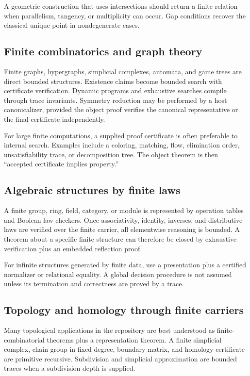 A geometric construction that uses intersections should return a finite relation when parallelism, tangency, or multiplicity can occur.  Gap conditions recover the classical unique point in nondegenerate cases.

\subsection{Finite combinatorics and graph theory}

Finite graphs, hypergraphs, simplicial complexes, automata, and game trees are direct bounded structures.  Existence claims become bounded search with certificate verification.  Dynamic programs and exhaustive searches compile through trace invariants.  Symmetry reduction may be performed by a host canonicalizer, provided the object proof verifies the canonical representative or the final certificate independently.

For large finite computations, a supplied proof certificate is often preferable to internal search.  Examples include a coloring, matching, flow, elimination order, unsatisfiability trace, or decomposition tree.  The object theorem is then ``accepted certificate implies property.''

\subsection{Algebraic structures by finite laws}

A finite group, ring, field, category, or module is represented by operation tables and Boolean law checkers.  Once associativity, identity, inverses, and distributive laws are verified over the finite carrier, all elementwise reasoning is bounded.  A theorem about a specific finite structure can therefore be closed by exhaustive verification plus an embedded reflection proof.

For infinite structures generated by finite data, use a presentation plus a certified normalizer or relational equality.  A global decision procedure is not assumed unless its termination and correctness are proved by a trace.

\subsection{Topology and homology through finite carriers}

Many topological applications in the repository are best understood as finite-combinatorial theorems plus a representation theorem.  A finite simplicial complex, chain group in fixed degree, boundary matrix, and homology certificate are primitive recursive.  Subdivision and simplicial approximation are bounded traces when a subdivision depth is supplied.

